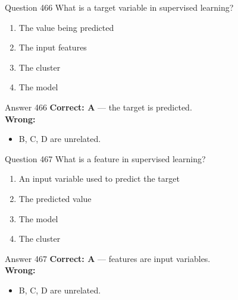 \documentclass[aspectratio=169,11pt]{beamer}
\begin{document}
	\begin{frame}{Question 466}
		What is a target variable in supervised learning?
		\begin{enumerate}[label=\Alph*.]
			\item The value being predicted
			\item The input features
			\item The cluster
			\item The model
		\end{enumerate}
	\end{frame}
	\begin{frame}{Answer 466}
		\textbf{Correct: A} --- the target is predicted.\\
		\vspace{0.5em}
		\textbf{Wrong:}
		\begin{itemize}
			\item B, C, D are unrelated.
		\end{itemize}
	\end{frame}
	
	\begin{frame}{Question 467}
		What is a feature in supervised learning?
		\begin{enumerate}[label=\Alph*.]
			\item An input variable used to predict the target
			\item The predicted value
			\item The model
			\item The cluster
		\end{enumerate}
	\end{frame}
	\begin{frame}{Answer 467}
		\textbf{Correct: A} --- features are input variables.\\
		\vspace{0.5em}
		\textbf{Wrong:}
		\begin{itemize}
			\item B, C, D are unrelated.
		\end{itemize}
	\end{frame}
	
\end{document}
